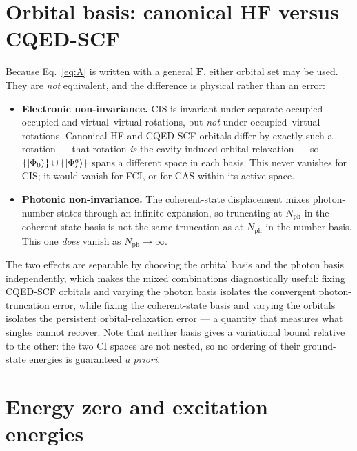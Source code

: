 \documentclass[11pt]{article}
\newcommand{\nph}{N_{\mathrm{ph}}}
\begin{document}
\section{Orbital basis: canonical HF versus CQED-SCF}
\label{sec:orbitals}

Because Eq.~\eqref{eq:A} is written with a general $\bm{F}$, either orbital set
may be used. They are \emph{not} equivalent, and the difference is physical
rather than an error:

\begin{itemize}[leftmargin=1.4em, itemsep=3pt]
\item \textbf{Electronic non-invariance.} CIS is invariant under separate
occupied--occupied and virtual--virtual rotations, but \emph{not} under
occupied--virtual rotations. Canonical HF and CQED-SCF orbitals differ by
exactly such a rotation --- that rotation \emph{is} the cavity-induced orbital
relaxation --- so $\{\ket{\Phi_0}\} \cup \{\ket{\Phi_i^a}\}$ spans a different
space in each basis. This never vanishes for CIS; it would vanish for FCI, or
for CAS within its active space.
\item \textbf{Photonic non-invariance.} The coherent-state displacement mixes
photon-number states through an infinite expansion, so truncating at $\nph$ in
the coherent-state basis is not the same truncation as at $\nph$ in the number
basis. This one \emph{does} vanish as $\nph \to \infty$.
\end{itemize}

\noindent
The two effects are separable by choosing the orbital basis and the photon basis
independently, which makes the mixed combinations diagnostically useful: fixing
CQED-SCF orbitals and varying the photon basis isolates the convergent
photon-truncation error, while fixing the coherent-state basis and varying the
orbitals isolates the persistent orbital-relaxation error --- a quantity that
measures what singles cannot recover. Note that neither basis gives a variational
bound relative to the other: the two CI spaces are not nested, so no ordering of
their ground-state energies is guaranteed \emph{a priori}.

\section{Energy zero and excitation energies}
\label{sec:zero}
\end{document}
